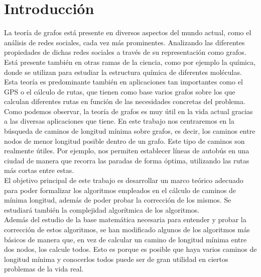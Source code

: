 %


\chapter{Introducción}

La teoría de grafos está presente en diversos aspectos del mundo actual, como el análisis de redes sociales, cada vez más prominentes. Analizando las diferentes propiedades de dichas redes sociales a través de su representación como grafos. Está presente también en otras ramas de la ciencia, como por ejemplo la química, donde se utilizan para estudiar la estructura química de diferentes moléculas. \\

Esta teoría es predominante también en aplicaciones tan importantes como el GPS o el cálculo de rutas, que tienen como base varios grafos sobre los que calculan diferentes rutas en función de las necesidades concretas del problema. \\

Como podemos observar, la teoría de grafos es muy útil en la vida actual gracias a las diversas aplicaciones que tiene. En este trabajo nos centraremos en la búsqueda de caminos de longitud mínima sobre grafos, es decir, los caminos entre nodos de menor longitud posible dentro de un grafo. Este tipo de caminos son realmente útiles. Por ejemplo, nos permiten establecer líneas de autobús en una ciudad de manera que recorra las paradas de forma óptima, utilizando las rutas más cortas entre estas. \\

El objetivo principal de este trabajo es desarrollar un marco teórico adecuado para poder formalizar los algoritmos empleados en el cálculo de caminos de mínima longitud, además de poder probar la corrección de los mismos. Se estudiará también la complejidad algorítmica de los algoritmos. \\

Además del estudio de la base matemática necesaria para entender y probar la corrección de estos algoritmos, se han modificado algunos de los algoritmos más básicos de manera que, en vez de calcular un camino de longitud mínima entre dos nodos, los calcule todos. Esto es porque es posible que haya varios caminos de longitud mínima y conocerlos todos puede ser de gran utilidad en ciertos problemas de la vida real. \\

